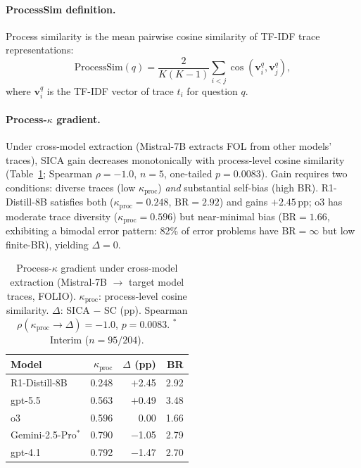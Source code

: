 \paragraph{ProcessSim definition.}
\label{app:process-sim}
Process similarity is the mean pairwise cosine similarity of TF-IDF trace representations:
\begin{equation}
\label{eq:process-sim}
\text{ProcessSim}(q) = \frac{2}{K(K{-}1)} \sum_{i < j} \cos(\mathbf{v}_i^q, \mathbf{v}_j^q),
\end{equation}
where $\mathbf{v}_i^q$ is the TF-IDF vector of trace $t_i$ for question $q$.

\paragraph{Process-$\kappa$ gradient.}
\label{app:process-gradient}
Under cross-model extraction (Mistral-7B extracts FOL from other models' traces), SICA gain decreases monotonically with process-level cosine similarity (Table~\ref{tab:process-gradient}; Spearman $\rho = -1.0$, $n = 5$, one-tailed $p = 0.0083$). Gain requires two conditions: diverse traces (low $\kappa_{\text{proc}}$) \emph{and} substantial self-bias (high BR). R1-Distill-8B satisfies both ($\kappa_{\text{proc}} = 0.248$, $\text{BR} = 2.92$) and gains $+2.45$\,pp; o3 has moderate trace diversity ($\kappa_{\text{proc}} = 0.596$) but near-minimal bias ($\text{BR} = 1.66$, exhibiting a bimodal error pattern: 82\% of error problems have $\text{BR} = \infty$ but low finite-BR), yielding $\Delta = 0$.

\begin{table}[h]
\centering
\small
\caption{Process-$\kappa$ gradient under cross-model extraction (Mistral-7B $\rightarrow$ target model traces, FOLIO). $\kappa_{\text{proc}}$: process-level cosine similarity. $\Delta$: SICA $-$ SC (pp). Spearman $\rho(\kappa_{\text{proc}} \rightarrow \Delta) = -1.0$, $p = 0.0083$. $^*$Interim ($n = 95/204$).}
\label{tab:process-gradient}
\begin{tabular}{@{}lrrr@{}}
\toprule
Model & $\kappa_{\text{proc}}$ & $\Delta$ (pp) & BR \\
\midrule
R1-Distill-8B & 0.248 & $+$2.45 & 2.92 \\
gpt-5.5 & 0.563 & $+$0.49 & 3.48 \\
o3 & 0.596 & 0.00 & 1.66 \\
Gemini-2.5-Pro$^*$ & 0.790 & $-$1.05 & 2.79 \\
gpt-4.1 & 0.792 & $-$1.47 & 2.70 \\
\bottomrule
\end{tabular}
\end{table}


